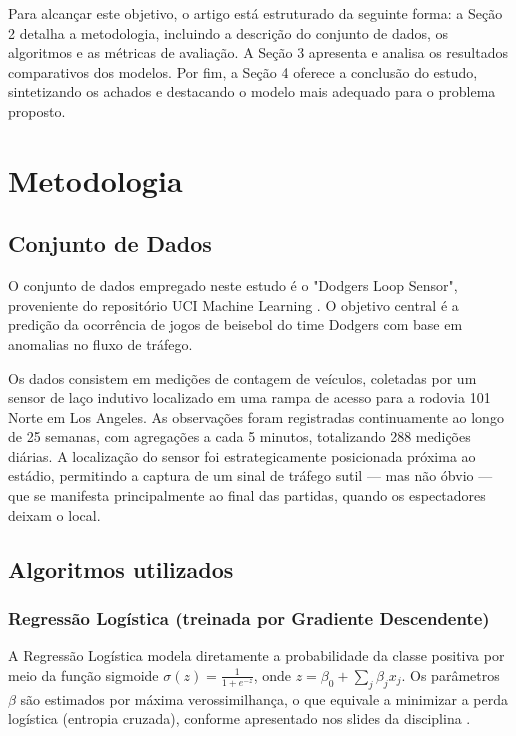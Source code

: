 \documentclass[12pt]{article}
\begin{document}
Para alcançar este objetivo, o artigo está estruturado da seguinte forma: a Seção 2 detalha a metodologia, incluindo a descrição do conjunto de dados, os algoritmos e as métricas de avaliação. A Seção 3 apresenta e analisa os resultados comparativos dos modelos. Por fim, a Seção 4 oferece a conclusão do estudo, sintetizando os achados e destacando o modelo mais adequado para o problema proposto.

\section{Metodologia} \label{sec:metodologia}

\subsection{Conjunto de Dados}

O conjunto de dados empregado neste estudo é o "Dodgers Loop Sensor", proveniente do repositório UCI Machine Learning \cite{misc_dodgers_2010}. O objetivo central é a predição da ocorrência de jogos de beisebol do time Dodgers com base em anomalias no fluxo de tráfego.

Os dados consistem em medições de contagem de veículos, coletadas por um sensor de laço indutivo localizado em uma rampa de acesso para a rodovia 101 Norte em Los Angeles. As observações foram registradas continuamente ao longo de 25 semanas, com agregações a cada 5 minutos, totalizando 288 medições diárias. A localização do sensor foi estrategicamente posicionada próxima ao estádio, permitindo a captura de um sinal de tráfego sutil — mas não óbvio — que se manifesta principalmente ao final das partidas, quando os espectadores deixam o local.

\subsection{Algoritmos utilizados}

\subsubsection{Regressão Logística (treinada por Gradiente Descendente)}
A Regressão Logística modela diretamente a probabilidade da classe positiva por meio da função sigmoide
$\sigma(z) = \frac{1}{1 + e^{-z}}$, onde $z = \beta_0 + \sum_j \beta_j x_j$.
Os parâmetros $\beta$ são estimados por máxima verossimilhança, o que equivale a minimizar a perda logística
(entropia cruzada), conforme apresentado nos slides da disciplina \cite{naozuka_logistica_2025}.
\end{document}
